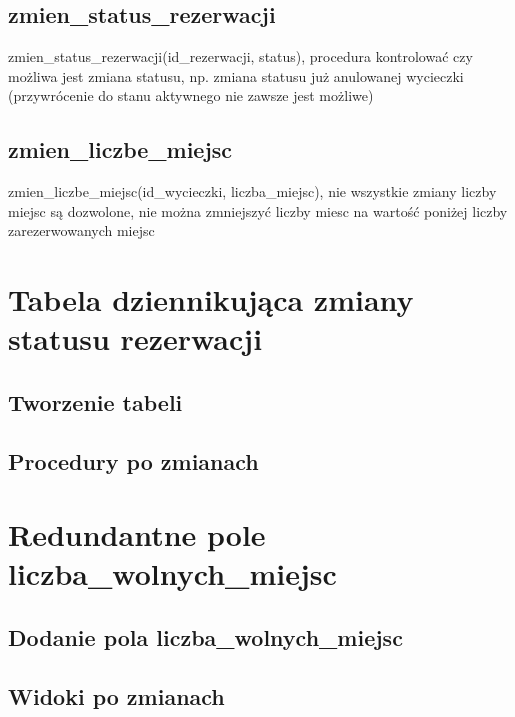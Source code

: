 \documentclass[12pt]{article}
\begin{document}
\subsection{zmien\_status\_rezerwacji}
zmien\_status\_rezerwacji(id\_rezerwacji, status), procedura kontrolować czy możliwa jest
zmiana statusu, np. zmiana statusu już anulowanej wycieczki (przywrócenie do stanu
aktywnego nie zawsze jest możliwe)

\subsection{zmien\_liczbe\_miejsc}
zmien\_liczbe\_miejsc(id\_wycieczki, liczba\_miejsc), nie wszystkie zmiany liczby miejsc są
dozwolone, nie można zmniejszyć liczby miesc na wartość poniżej liczby zarezerwowanych
miejsc


\section{Tabela dziennikująca zmiany statusu rezerwacji}
\subsection{Tworzenie tabeli}


\subsection{Procedury po zmianach}



\section{Redundantne pole liczba\_wolnych\_miejsc}
\subsection{Dodanie pola liczba\_wolnych\_miejsc}

\subsection{Widoki po zmianach}





\end{document}
